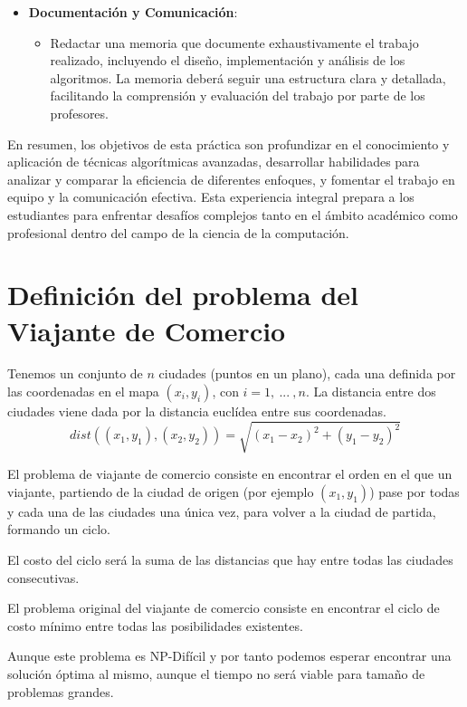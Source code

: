 \documentclass{article}
\begin{document}
\begin{itemize}
\begin{itemize}
        \end{itemize}
    \item \textbf{Documentación y Comunicación}:
        \begin{itemize}
            \item Redactar una memoria que documente exhaustivamente el trabajo realizado, incluyendo el diseño, implementación y análisis de los algoritmos. La memoria deberá seguir una estructura clara y detallada, facilitando la comprensión y evaluación del trabajo por parte de los profesores.
        \end{itemize}
\end{itemize}

En resumen, los objetivos de esta práctica son profundizar en el conocimiento y aplicación de técnicas algorítmicas avanzadas, desarrollar habilidades para analizar y comparar la eficiencia de diferentes enfoques, y fomentar el trabajo en equipo y la comunicación efectiva. Esta experiencia integral prepara a los estudiantes para enfrentar desafíos complejos tanto en el ámbito académico como profesional dentro del campo de la ciencia de la computación.


\newpage

\section{Definición del problema del Viajante de Comercio}
Tenemos un conjunto de $n$ ciudades (puntos en un plano),
cada una definida por las coordenadas en el mapa $(x_i, y_i)$,
con $i = 1,\ ...\ , n$. La distancia entre dos ciudades viene
dada por la distancia euclídea entre sus coordenadas.
\[
dist((x_1, y_1),(x_2, y_2)) = \sqrt{(x_1 - x_2)^2 + (y_1 - y_2)^2}
\]

El problema de viajante de comercio consiste en encontrar el
orden en el que un viajante, partiendo de la ciudad de origen
(por ejemplo $(x_1, y_1)$) pase por todas y cada una de las ciudades
una única vez, para volver a la ciudad de partida, formando un ciclo.

El costo del ciclo será la suma de las distancias que hay entre todas las ciudades consecutivas.

El problema original del viajante de comercio consiste en encontrar el ciclo de costo mínimo entre todas las posibilidades existentes.

Aunque este problema es NP-Difícil y por tanto podemos esperar encontrar una solución
óptima al mismo, aunque el tiempo no será viable para tamaño de problemas grandes.
\end{document}
